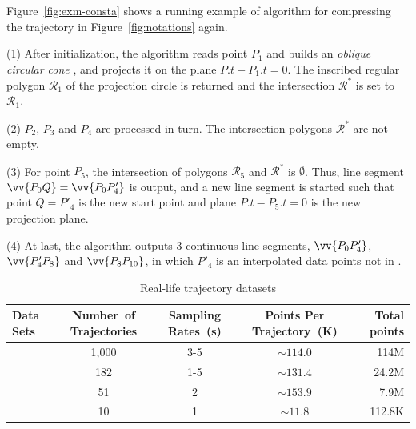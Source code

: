 \begin{example}
\label{exm-alg-conesta}
Figure~\ref{fig:exm-consta}  shows a running example of algorithm \cista for compressing the trajectory  in Figure~\ref{fig:notations} again.


\sstab (1) After initialization, the \cista algorithm reads point $P_1$ and builds an \emph{oblique circular cone} , and projects it on the plane $P.t-P_1.t=0$. The inscribed regular polygon $\mathcal{R}_1$ of the projection circle is returned and the intersection $\mathcal{R}^*$ is set to $\mathcal{R}_1$.

\sstab (2) $P_2$, $P_3$ and $P_4$ are processed in turn. The intersection polygons $\mathcal{R}^*$ are not empty.

\sstab (3) For point $P_5$, the intersection of polygons $\mathcal{R}_5$ and $\mathcal{R}^*$ is $\emptyset$. Thus, line segment $\vv{P_0Q} =\vv{P_0P'_4}$ is output, and a new line segment is started such that point $Q=P'_4$ is the new start point and plane $P.t-P_5.t=0$ is the new projection plane.

\sstab (4) At last, the algorithm outputs 3 continuous line segments, \ie $\vv{P_0P'_4}$, $\vv{P'_4P_8}$ and $\vv{P_8P_{10}}$, in which $P'_4$ is an interpolated data points not in .
\end{example}



\begin{table}[bt!]
	\vspace{-1ex}
	\caption{\small Real-life trajectory datasets}
	\centering
	\small
	\begin{tabular}{|l|c|c|c|r|}
		\hline
		\bf{ Data Sets}& \bf{Number\ of Trajectories}     &\bf {Sampling Rates\ (s)}   &\bf{Points Per Trajectory\ (K)}    &\bf {Total points} \\
		\hline
		\sercar	&1,000	    &3-5	    &$\sim114.0$   &114M\\
		\hline
		\geolife &182	    &1-5	    &$\sim131.4$   &24.2M\\
		\hline
		\mopsi	&51	    	&2	    &$\sim153.9$     &7.9M\\
		\hline
		\pricar	& 10	    &1	        &$\sim11.8$      &112.8K \\
		\hline
	\end{tabular}
	\label{tab:datasets}
\end{table}

